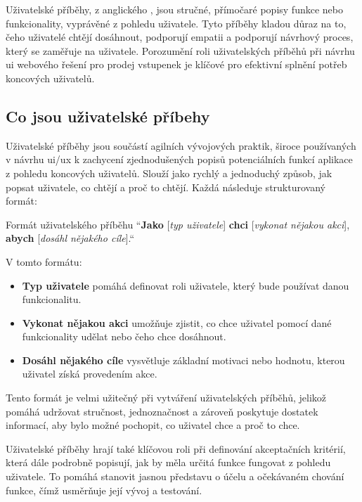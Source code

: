 Uživatelské příběhy, z anglického , jsou stručné, přímočaré popisy funkce nebo funkcionality, vyprávěné z pohledu uživatele.
Tyto příběhy kladou důraz na to, čeho uživatelé chtějí dosáhnout, podporují empatii a podporují návrhový proces, který se zaměřuje na uživatele.
Porozumění roli uživatelských příběhů při návrhu \ac{ui} webového řešení pro prodej vstupenek je klíčové pro efektivní splnění potřeb koncových uživatelů.

\subsection{Co jsou uživatelské příbehy}
\label{subsec:navrh-ui-uzivatelske-pribehy-co-jsou}

Uživatelské příběhy jsou součástí agilních vývojových praktik, široce používaných v návrhu \ac{ui}/\ac{ux} k zachycení zjednodušených popisů potenciálních funkcí aplikace z pohledu koncových uživatelů.
Slouží jako rychlý a jednoduchý způsob, jak popsat uživatele, co chtějí a proč to chtějí.
Každá  následuje strukturovaný formát:

\begin{gray-box}{Formát uživatelského příběhu}
    ``\textbf{Jako} [\textit{typ uživatele}] \textbf{chci} [\textit{vykonat nějakou akci}], \textbf{abych} [\textit{dosáhl nějakého cíle}].``
\end{gray-box}

V tomto formátu:
\begin{itemize}
    \item \textbf{Typ uživatele} pomáhá definovat roli uživatele, který bude používat danou funkcionalitu.
    \item \textbf{Vykonat nějakou akci} umožňuje zjistit, co chce uživatel pomocí dané funkcionality udělat nebo čeho chce dosáhnout.
    \item \textbf{Dosáhl nějakého cíle} vysvětluje základní motivaci nebo hodnotu, kterou uživatel získá provedením akce.
\end{itemize}

Tento formát je velmi užitečný při vytváření uživatelských příběhů, jelikož pomáhá udržovat stručnost, jednoznačnost a zároveň poskytuje dostatek informací, aby bylo možné pochopit, co uživatel chce a proč to chce.

Uživatelské příběhy hrají také klíčovou roli při definování akceptačních kritérií, která dále podrobně popisují, jak by měla určitá funkce fungovat z pohledu uživatele.
To pomáhá stanovit jasnou představu o účelu a očekávaném chování funkce, čímž usměrňuje její vývoj a testování.


